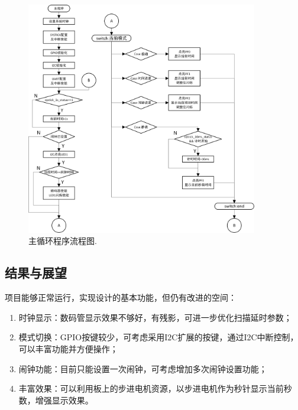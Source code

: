 \documentclass[12pt, a4paper, oneside]{ctexart}
\begin{document}
    \begin{figure}[t]
        \centering
        \includegraphics[width=0.9\textwidth]{./img/flowchart_main.png}
        \caption{主循环程序流程图.} 
        \label{fig:main}
    \end{figure}


    \FloatBarrier
    \subsection{结果与展望}
    项目能够正常运行，实现设计的基本功能，但仍有改进的空间：
    \begin{enumerate}
        \item 时钟显示：数码管显示效果不够好，有残影，可进一步优化扫描延时参数；
        \item 模式切换：GPIO按键较少，可考虑采用I2C扩展的按键，通过I2C中断控制，可以丰富功能并方便操作；
        \item 闹钟功能：目前只能设置一次闹钟，可考虑增加多次闹钟设置功能；
        \item 丰富效果：可以利用板上的步进电机资源，以步进电机作为秒针显示当前秒数，增强显示效果。
    \end{enumerate}

     
\end{document}
